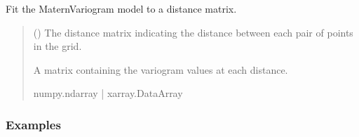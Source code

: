 \documentclass[letterpaper,10pt,english]{sphinxmanual}
\begin{document}
\begin{fulllineitems}
\begin{fulllineitems}
\label{\detokenize{covariance:glomar_gridding.variogram.MaternVariogram.fit}}
\pysigstartsignatures
\pysiglinewithargsret
{}
{}
{}
\pysigstopsignatures
\sphinxAtStartPar
Fit the MaternVariogram model to a distance matrix.
\begin{quote}\begin{description}
\sphinxAtStartPar
{} (\sphinxstyleliteralemphasis{\sphinxupquote{ | }}) \textendash{} The distance matrix indicating the distance between each pair of
points in the grid.

\sphinxAtStartPar
A matrix containing the variogram values at each distance.

\sphinxAtStartPar
numpy.ndarray | xarray.DataArray

\end{description}\end{quote}
\subsubsection*{Examples}

\begin{sphinxVerbatim}[commandchars=\\\{\}]
\end{sphinxVerbatim}

\end{fulllineitems}


\end{fulllineitems}

\end{document}
